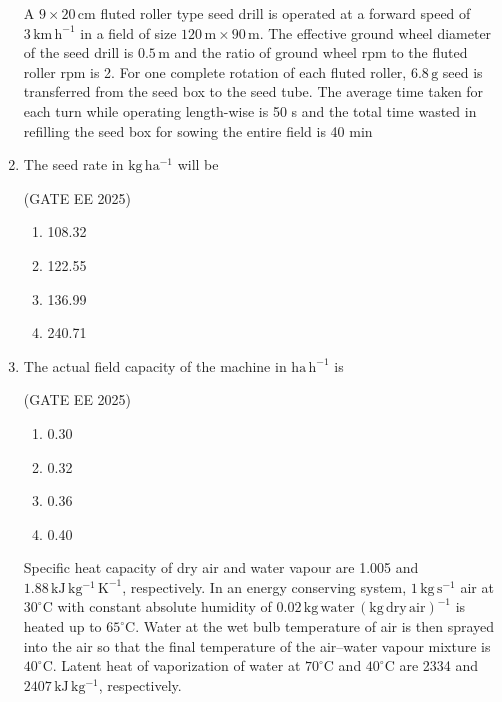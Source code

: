 \documentclass[journal,12pt,onecolumn]{IEEEtran}
\theoremstyle{remark}
\begin{document}
\begin{enumerate}
 A $9\times20\,\mathrm{cm}$ fluted roller type seed drill is operated at a forward speed of $3\,\mathrm{km\,h^{-1}}$ in a field of size $120\,\mathrm{m} \times 90\,\mathrm{m}$. The effective ground wheel diameter of the seed drill is $0.5\,\mathrm{m}$ and the ratio of ground wheel rpm to the fluted roller rpm is 2. For one complete rotation of each fluted roller, $6.8\,\mathrm{g}$ seed is transferred from the seed box to the seed tube. The average time taken for each turn while operating length-wise is 50 s and the total time wasted in refilling the seed box for sowing the entire field is 40 min
\item The seed rate in $\mathrm{kg\,ha^{-1}}$ will be\

\hfill(GATE EE 2025)

\begin{multicols}{4}
    \begin{enumerate}
        \item 108.32
        \item 122.55
        \item 136.99
        \item 240.71
    \end{enumerate}
\end{multicols}

\item The actual field capacity of the machine in $\mathrm{ha\,h^{-1}}$ is\

\hfill(GATE EE 2025)

\begin{multicols}{4}
    \begin{enumerate}
        \item 0.30
        \item 0.32
        \item 0.36
        \item 0.40
    \end{enumerate}
\end{multicols}


Specific heat capacity of dry air and water vapour are 1.005 and $1.88\,\mathrm{kJ\,kg^{-1}\,K^{-1}}$, respectively. In an energy conserving system, $1\,\mathrm{kg\,s^{-1}}$ air at $30^{\circ}\mathrm{C}$ with constant absolute humidity of $0.02\,\mathrm{kg\,water\,(kg\,dry\,air)^{-1}}$ is heated up to $65^{\circ}\mathrm{C}$. Water at the wet bulb temperature of air is then sprayed into the air so that the final temperature of the air--water vapour mixture is $40^{\circ}\mathrm{C}$. Latent heat of vaporization of water at $70^{\circ}\mathrm{C}$ and $40^{\circ}\mathrm{C}$ are 2334 and $2407\,\mathrm{kJ\,kg^{-1}}$, respectively.


\end{enumerate}
\end{document}
